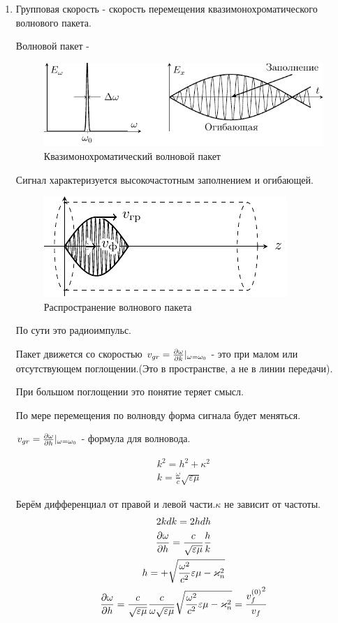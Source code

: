 \begin{enumerate}
 	\item Групповая скорость - скорость перемещения квазимонохроматического волнового пакета. 

 	Волновой пакет - 

\begin{figure}[H]
	\centering
	\includegraphics[scale=1.5]{img/lect3_ris8}
	\caption{Квазимонохроматический волновой пакет}
	\label{fig:lect3:8}
\end{figure}
	Сигнал характеризуется высокочастотным заполнением и огибающей.

\begin{figure}[H]
	\centering
	\includegraphics[scale=1.5]{img/lect3_ris9}
	\caption{Распространение волнового пакета}
	\label{fig:lect3:9}
\end{figure}
	По сути это радиоимпульс.

	Пакет движется со скоростью $ v_{gr} = \pdv{\omega}{k}\vert_{\omega = \omega_{0}} $ - это при малом или отсутствующем поглощении.(Это в пространстве, а не в линии передачи).

	При большом поглощении это понятие теряет смысл.

	По мере перемещения по волновду форма сигнала будет меняться.

	 $v_{gr} = \pdv{\omega}{h}\vert_{\omega = \omega_{0}} $ - формула для волновода. 

	 \begin{gather}
	 	k^2 = h^2 + \kappa^2\\
	 	k = \frac{\omega}{c} \sqrt{ \varepsilon \mu}
	 \end{gather}

	Берём дифференциал от правой и левой части.$\kappa$  не зависит от частоты.
	\begin{gather}
		2k dk = 2h dh\\
		\pdv{\omega}{h} = \frac{c}{\sqrt{\varepsilon \mu}} \frac{h}{k}\\
		h = + \sqrt{\frac{\omega^2}{c^2} \varepsilon \mu -\varkappa^2_n}\\
		\pdv{\omega}{h} = \frac{c}{\sqrt{\varepsilon \mu}} \frac{c}{\omega \sqrt{\varepsilon \mu}} \sqrt{\frac{\omega^2}{c^2} \varepsilon \mu -\varkappa^2_n} = \frac{{v_f^{(0)}}^2}{v_f}
 	\end{gather}


\end{enumerate}
